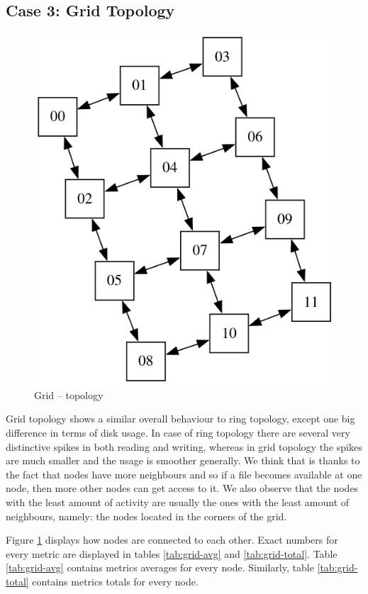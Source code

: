 



\newpage
\subsection{Case 3: Grid Topology}

\begin{figure}
\centering
\captionsetup{justification=centering,width=0.5\linewidth}
\includegraphics[width=0.7\linewidth]{figures/topologies/grid.png}
\caption{Grid -- topology}
\label{fig:grid-topology}
\end{figure}

Grid topology shows a similar overall behaviour to ring topology, except one
big difference in terms of disk usage. In case of ring topology there are
several very distinctive spikes in both reading and writing, whereas in grid
topology the spikes are much smaller and the usage is smoother generally. We
think that is thanks to the fact that nodes have more neighbours and so if a
file becomes available at one node, then more other nodes can get access to it.
We also observe that the nodes with the least amount of activity are usually
the ones with the least amount of neighbours, namely: the nodes located in the
corners of the grid.

Figure \ref{fig:grid-topology} displays how nodes are connected to each other.
Exact numbers for every metric are displayed in tables \ref{tab:grid-avg} and
\ref{tab:grid-total}. Table \ref{tab:grid-avg} contains metrics averages for
every node. Similarly, table \ref{tab:grid-total} contains metrics totals for
every node.

